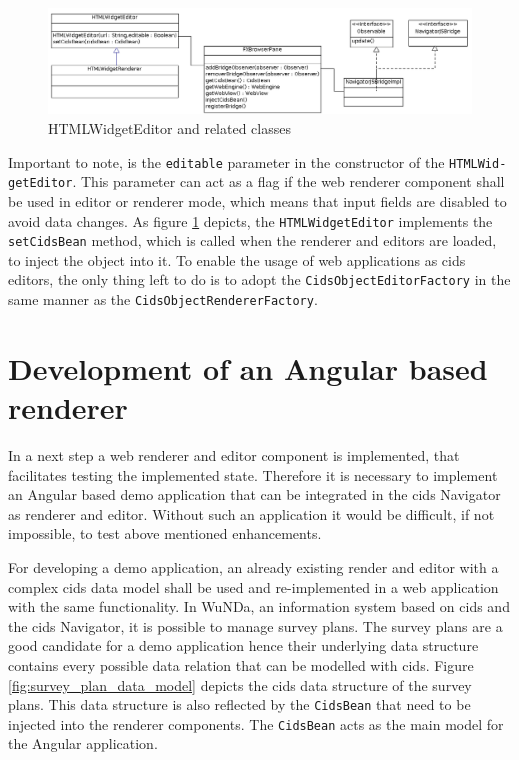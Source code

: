 \begin{figure}
	\centering	\includegraphics[width=1.0\textwidth]{./img/classDiagramms/html_editor.png}
	\caption{HTMLWidgetEditor and related classes}
	\label{fig:class_diag_html_widget_editor}
\end{figure}

Important to note, is the \texttt{editable} parameter in the constructor of the \texttt{HTMLWid-}
\texttt{getEditor}.
This parameter can act as a flag if  the web renderer component shall be used in editor or renderer mode, which means that input fields are disabled to avoid data changes.
As figure \ref{fig:class_diag_html_widget_editor} depicts, the \texttt{HTMLWidgetEditor} implements the \texttt{setCidsBean} method, which is called when the renderer and editors are loaded, to inject the object into it.
To enable the usage of web applications as cids editors, the only thing left to do is to adopt the \texttt{CidsObjectEditorFactory} in the same manner as the \texttt{CidsObjectRendererFactory}.

\section{Development of an Angular based renderer}

In a next step a web renderer and editor component is implemented, that facilitates testing the implemented state.
Therefore it is necessary to implement an Angular based demo application that can be integrated in the cids Navigator as renderer and editor.
Without such an application it would be difficult, if not impossible, to test above mentioned enhancements.

For developing a demo application, an already existing render and editor with a complex cids data model shall be used and re-implemented in a web application with the same functionality.
In WuNDa, an information system based on cids and the cids Navigator, it is possible to manage survey plans.
The survey plans are a good candidate for a demo application hence their underlying data structure contains every possible data relation that can be modelled with cids.
Figure \ref{fig:survey_plan_data_model} depicts the cids data structure of the survey plans.
This data structure is also reflected by the \texttt{CidsBean} that need to be injected into the renderer components.
The \texttt{CidsBean} acts as the main model for the Angular application.

